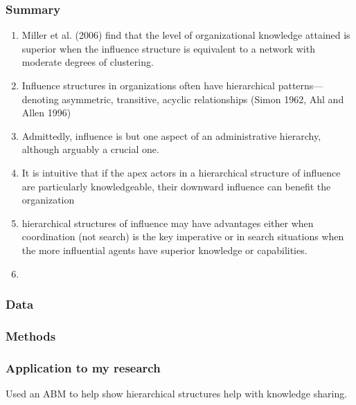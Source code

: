 \documentclass[12pt]{article}
\begin{document}
\subsubsection*{Summary}

\begin{enumerate}
    \item Miller et al. (2006) find that the level of organizational knowledge attained is superior when the influence structure is equivalent to a network with moderate degrees of clustering.
    \item Influence structures in organizations often have hierarchical patterns—denoting asymmetric, transitive, acyclic relationships (Simon 1962, Ahl and Allen 1996)
    \item Admittedly, influence is but one aspect of an administrative hierarchy, although arguably a crucial one.
    \item It is intuitive that if the apex actors in a hierarchical structure of influence are particularly knowledgeable, their downward influence can benefit the organization
    \item hierarchical structures of influence may have advantages either when coordination (not search) is the key imperative or in search situations when the more influential agents have superior knowledge or capabilities. 
    \item 
\end{enumerate}

\subsubsection*{Data}

\subsubsection*{Methods}

\subsubsection*{Application to my research}

Used an ABM to help show hierarchical structures help with knowledge sharing.




\end{document}
